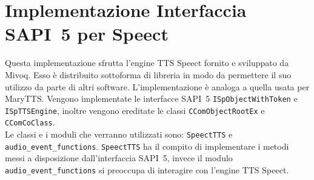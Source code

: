 \section{Implementazione Interfaccia SAPI~5 per Speect}
Questa implementazione sfrutta l'engine TTS Speect fornito e sviluppato da Mivoq. Esso è distribuito sottoforma di libreria in modo da permettere il suo utilizzo da parte di altri software.
L'implementazione è analoga a quella usata per MaryTTS. Vengono implementate le interfacce SAPI~5 \texttt{ISpObjectWithToken} e \texttt{ISpTTSEngine}, inoltre vengono ereditate le classi \texttt{CComObjectRootEx} e\\\texttt{CComCoClass}.\\
Le classi e i moduli che verranno utilizzati sono: \texttt{SpeectTTS} e \texttt{audio\_event\_functions}.
\texttt{SpeectTTS} ha il compito di implementare i metodi messi a disposizione dall'interfaccia SAPI~5, invece il modulo \texttt{audio\_event\_functions} si preoccupa di interagire con l'engine TTS Speect.
